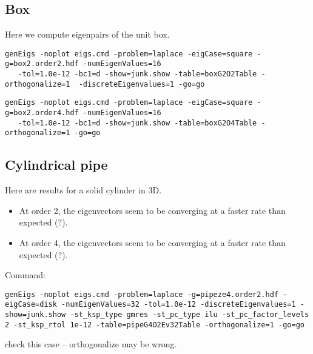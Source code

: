 \documentclass[preprint,11pt]{elsarticle}
\newcommand{\red}{\color{red}}
\begin{document}
\subsection{Box} \label{sec:box}

Here we compute eigenpairs of the unit box. 

\begin{Verbatim}[fontsize=\footnotesize]
genEigs -noplot eigs.cmd -problem=laplace -eigCase=square -g=box2.order2.hdf -numEigenValues=16 
   -tol=1.0e-12 -bc1=d -show=junk.show -table=boxG2O2Table -orthogonalize=1  -discreteEigenvalues=1 -go=go
\end{Verbatim}



\begin{Verbatim}[fontsize=\footnotesize]
genEigs -noplot eigs.cmd -problem=laplace -eigCase=square -g=box2.order4.hdf -numEigenValues=16 
   -tol=1.0e-12 -bc1=d -show=junk.show -table=boxG2O4Table -orthogonalize=1 -go=go
\end{Verbatim}




\clearpage
\subsection{Cylindrical pipe} \label{sec:cylinder}





Here are results for a solid cylinder in 3D.
\begin{itemize}
  \item At order 2, the eigenvectors seem to be converging at a faster rate than expected (?).
  \item At order 4, the eigenvectors seem to be converging at a faster rate than expected (?).
\end{itemize}

\mni
Command: 
\begin{Verbatim}[fontsize=\footnotesize]
genEigs -noplot eigs.cmd -problem=laplace -g=pipeze4.order2.hdf -eigCase=disk -numEigenValues=32 -tol=1.0e-12 -discreteEigenvalues=1 -show=junk.show -st_ksp_type gmres -st_pc_type ilu -st_pc_factor_levels 2 -st_ksp_rtol 1e-12 -table=pipeG4O2Ev32Table -orthogonalize=1 -go=go
\end{Verbatim}

\mni
{\red check this case -- orthogonalize may be wrong.}

\end{document}
